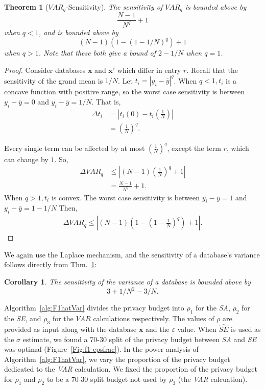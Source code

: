 \documentclass[USenglish,oneside]{article}
\newcounter{ag}
\newcounter{ab}
\newcounter{ar}
\newcounter{igh}
\newtheorem{theorem}{Theorem}
\newtheorem{corollary}{Corollary}
\newcommand{\eps}{\ensuremath{\varepsilon}\xspace}
\newcommand{\grand}{\bar{y}}
\newcommand{\se}{\textit{SE}\xspace}
\newcommand{\sa}{\textit{SA}\xspace}
\newcommand{\var}{\textit{VAR}\xspace}
\newcommand{\varq}{\ensuremath{\var_q}\xspace}
\newcommand{\x}{\ensuremath{\mathbf{x}}\xspace}
\newcommand{\xprime}{\ensuremath{\mathbf{x'}}\xspace}
\begin{document}
\begin{theorem}[\varq-Sensitivity] \label{thm:varqSens} 
The sensitivity of \varq is bounded above by
$$ \frac{N-1}{N^q} + 1 $$
when $q<1$, and is bounded above by
$$ (N-1)(1-(1-1/N)^q) + 1 $$
when $q>1$. Note that these both give a bound of $2-1/N$ when $q=1$.
\end{theorem}

\begin{proof}
Consider databases \x and \xprime which differ in entry $r$. Recall that the sensitivity of the grand mean is $1/N$. Let $t_i = \left\vert  y_i - \grand \right\vert ^q$. When $q<1, t_i$ is a concave function with positive range, so the worst case sensitivity is between $ y_i - \grand = 0$ and $ y_i - \grand = 1/N$. That is, 
\begin{align*}
\Delta t_i &= \left\vert t_{i}(0) - t_i\left(\frac{1}{N}\right) \right\vert \\
	&= \left( \frac{1}{N} \right)^q.
\end{align*}

Every single term can be affected by at most $\left( \frac{1}{N} \right)^q$, except the term $r$, which can change by $1$. So, 
\begin{align*}
\Delta \varq &\le \left\vert (N-1)(\frac{1}{N})^q + 1 \right\vert \\
	&= \frac{N-1}{N^q} + 1.
\end{align*}
%
When $q>1, t_i$ is convex. The worst case sensitivity is between  $y_i - \grand = 1$ and $y_i - \grand = 1-1/N$ Then,
\begin{align*}
\Delta \varq \le \left\vert (N-1)(1-(1-\frac{1}{N})^q) + 1 \right\vert.
\end{align*}
\end{proof}

We again use the Laplace mechanism, and the sensitivity of a database's variance follows directly from Thm.~\ref{thm:varqSens}:

\begin{corollary}
\label{thm:varsens}
The sensitivity of the variance of a database is bounded above by
$$ 3 + 1/N^2 - 3/N.$$
\end{corollary}

Algorithm~\ref{alg:F1hatVar} divides the privacy budget into $\rho_1$ for the \sa, $\rho_2$ for the \se, and $\rho_3$ for the $\var$ calculations respectively.  The values of $\rho$ are provided as input along with the database \x and the $\eps$ value. When $\widehat{SE}$ is used as the $\sigma$ estimate, we found a 70-30 split of the privacy budget between \sa and \se was optimal (Figure~\ref{Fig:f1-epsfrac}).   In the power analysis of Algorithm~\ref{alg:F1hatVar}, we vary the proportion of the privacy budget dedicated to the \var calculation.  We fixed the proportion of the privacy budget for $\rho_1$ and $\rho_2$ to be a 70-30 split budget not used by $\rho_3$ (the \var calcuation).  
\end{document}

